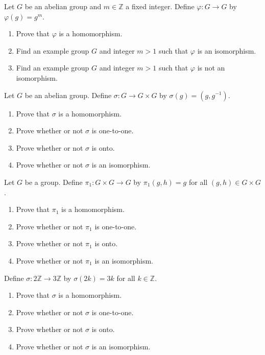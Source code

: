 
\newcommand{\Z}{\mathbb{Z}}
\newcommand{\abar}{\overline{a}}
\usepackage{enumitem}


Let $G$ be an abelian group and $m\in\Z$ a fixed integer. Define $\varphi:G\to G$ by $\varphi(g)=g^m$. 
\begin{enumerate}[label=(\alph*)]
	\item Prove that $\varphi$ is a homomorphism.\vfill
	\item Find an example group $G$ and integer $m>1$ such that $\varphi$ is an isomorphism.\vfill
	\item Find an example group $G$ and integer $m>1$ such that $\varphi$ is not an isomorphism.\vfill
\end{enumerate}
	

Let $G$ be an abelian group. Define $\sigma:G\to G\times G$ by $\sigma(g)=(g,g^{-1})$. 
\begin{enumerate}[label=(\alph*)]
	\item Prove that $\sigma$ is a homomorphism.\vfill
	\item Prove whether or not $\sigma$ is one-to-one.\vfill
	\item Prove whether or not $\sigma$ is onto.\vfill
	\item Prove whether or not $\sigma$ is an isomorphism.\vskip 1in
\end{enumerate}


Let $G$ be a group. Define $\pi_1:G\times G\to G$ by $\pi_1(g,h)=g$ for all $(g,h)\in G\times G$. 
\begin{enumerate}[label=(\alph*)]
	\item Prove that $\pi_1$ is a homomorphism.\vfill
	\item Prove whether or not $\pi_1$ is one-to-one.\vfill
	\item Prove whether or not $\pi_1$ is onto.\vfill
	\item Prove whether or not $\pi_1$ is an isomorphism.\vskip 1in
\end{enumerate}
	

Define $\sigma:2\Z\to 3\Z$ by $\sigma(2k)=3k$ for all $k\in\Z$. 
\begin{enumerate}[label=(\alph*)]
	\item Prove that $\sigma$ is a homomorphism.\vfill
	\item Prove whether or not $\sigma$ is one-to-one.\vfill
	\item Prove whether or not $\sigma$ is onto.\vfill
	\item Prove whether or not $\sigma$ is an isomorphism.\vskip 1in
\end{enumerate}

